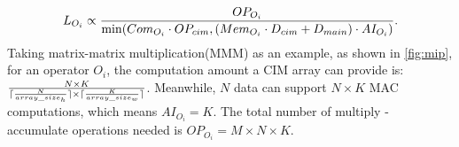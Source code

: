 \begin{equation}
    \scriptsize L_{O_i} \propto \frac{OP_{O_i}}{\min (Com_{O_i} \cdot OP_{cim}, (Mem_{O_i}\cdot D_{cim} + D_{main})\cdot AI_{O_i} )}. 
\label{eq:latency}
\end{equation}
Taking matrix-matrix multiplication(MMM) as an example, as shown in \fig \ref{fig:mip}, for an operator $O_i$, the computation amount a CIM array can provide is: $\scriptsize \frac{N\times K}{\lceil\frac{N}{array\_size_h}\rceil\times\lceil\frac{K}{array\_size_w}\rceil}$.
Meanwhile, $N$ data can support $N \times K$ MAC computations, which means $AI_{O_i} = K$. 
The total number of multiply - accumulate operations needed is $OP_{O_i} = M \times N \times K$. 


